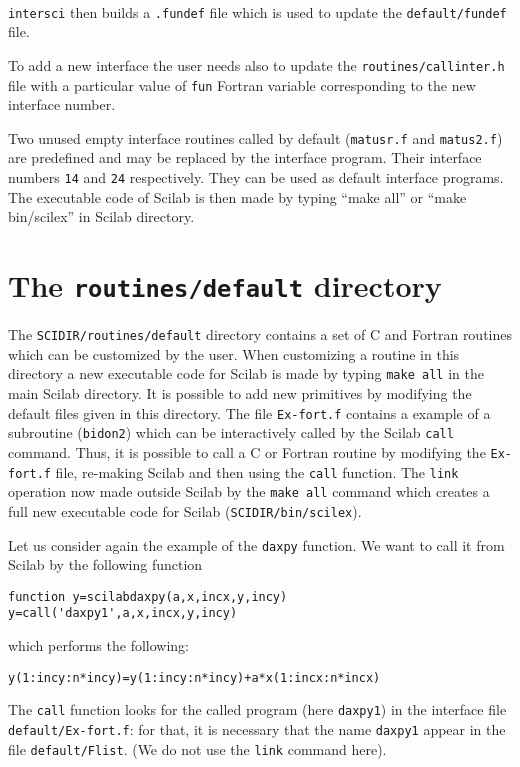 \T{\ }\\

{\tt intersci} then builds a {\tt .fundef} file which is used to
update the {\tt default/fundef} file.

To add a new interface the user needs also
to update the {\tt   routines/callinter.h} file with a particular 
value of {\tt fun} Fortran variable corresponding to the new interface
number.

Two unused empty interface routines called by default ({\tt matusr.f} 
and {\tt matus2.f}) are predefined and may be replaced by 
the interface program. Their interface numbers {\tt 14} and {\tt 24}
respectively. They can be used as default interface programs.
The executable code of Scilab is then made by typing ``make all''
or ``make bin/scilex'' in Scilab directory.

\section{The {\tt routines/default} directory}

The {\tt SCIDIR/routines/default} directory contains a set of C and Fortran
routines which can be customized by the user. When customizing a
routine in this directory a new executable code for Scilab is made
by typing {\tt make all} in the main Scilab directory. 
It is possible to add new primitives by modifying the default files
given in this directory. The file {\tt Ex-fort.f} contains a example
of a subroutine ({\tt bidon2}) which can be interactively called
by the Scilab {\tt call} command. Thus, it is possible 
to call a C or Fortran routine by modifying the {\tt Ex-fort.f}
file, re-making Scilab and then using the {\tt call} function.
The {\tt link} operation now made outside Scilab by the {\tt make all}
command which creates a full new executable code for Scilab 
({\tt SCIDIR/bin/scilex}).

Let us consider again the example of the {\tt daxpy} function.
We want to call it from Scilab by the following function 
\begin{verbatim}
function y=scilabdaxpy(a,x,incx,y,incy)
y=call('daxpy1',a,x,incx,y,incy)
\end{verbatim}
which performs the following: 

\verb!y(1:incy:n*incy)=y(1:incy:n*incy)+a*x(1:incx:n*incx)!

\noindent
The {\tt call} 
function looks for the called program (here {\tt daxpy1}) in the
interface file {\tt default/Ex-fort.f}: for that, it is necessary
that the name {\tt daxpy1} appear
in the file {\tt default/Flist}. (We do not use the {\tt link} command
here).

